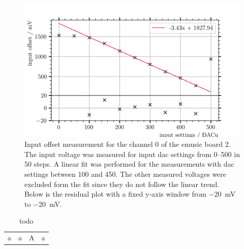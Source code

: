 \begin{figure}
	\centering
	\includegraphics[width=1.\textwidth]{pictures/input_offset_board_2_channel_0}
	\caption[Input offset measurement for eMUSIC board 2 channel 1]{Input offset measurement for the channel 0 of the \ac{emusic} board 2. The input voltage was measured for input \ac{dac} settings from \SIrange{0}{500}{\dacu} in \SI{50}{\dacu} steps. A linear fit was performed for the measurements with \ac{dac} settings between \SI{100}{\dacu} and \SI{450}{\dacu}. The other measured voltages were excluded form the fit since they do not follow the linear trend. Below is the residual plot with a fixed y-axis window from \SI{-20}{\milli\volt} to \SI{-20}{\milli\volt}.}
	\label{fig:input_offset_b2_ch0}
\end{figure}
\begin{table}
	\centering
	\caption[todo]{todo}
	\label{tab:input_offset_linear_fit}
	\begin{tabular}{|c|c|c|c|}
		a & a & A & a
	\end{tabular}
\end{table}

